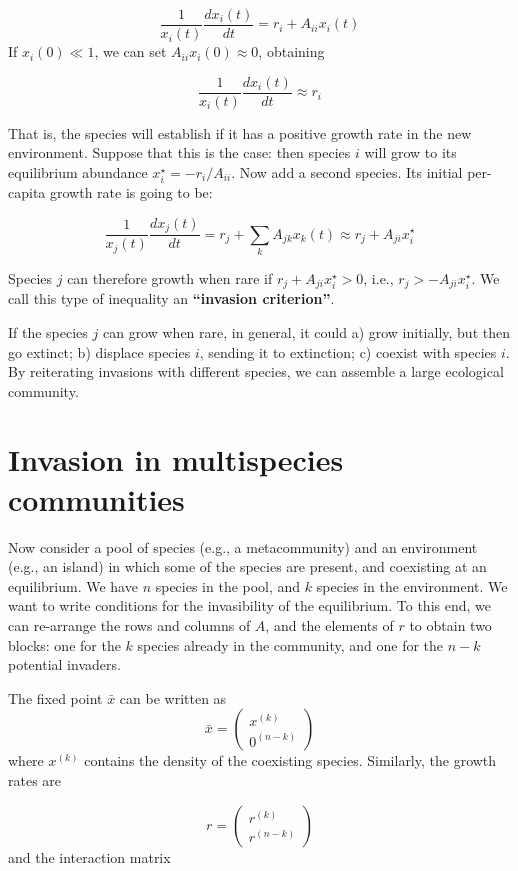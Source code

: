 \documentclass[]{book}
\begin{document}
\[
\dfrac{1}{x_i(t)}\dfrac{dx_i(t)}{dt} = r_i + A_{ii} x_i(t)
\]
If \(x_i(0) \ll 1\), we can set \(A_{ii} x_i(0) \approx 0\), obtaining

\[
\dfrac{1}{x_i(t)}\dfrac{dx_i(t)}{dt} \approx r_i
\]

That is, the species will establish if it has a positive growth rate in the new environment. Suppose that this is the case: then species \(i\) will grow to its equilibrium abundance \(x_i^\star = -r_i / A_{ii}\). Now add a second species. Its initial per-capita growth rate is going to be:

\[
\dfrac{1}{x_j(t)}\dfrac{dx_j(t)}{dt} = r_j + \sum_k A_{jk} x_k(t) \approx r_j + A_{ji}x_i^\star
\]

Species \(j\) can therefore growth when rare if \(r_j + A_{ji}x_i^\star > 0\), i.e., \(r_j > -A_{ji}x_i^\star\). We call this type of inequality an \textbf{``invasion criterion''}.

If the species \(j\) can grow when rare, in general, it could a) grow initially, but then go extinct; b) displace species \(i\), sending it to extinction; c) coexist with species \(i\). By reiterating invasions with different species, we can assemble a large ecological community.

\hypertarget{invasion-in-multispecies-communities}{%
\section{Invasion in multispecies communities}\label{invasion-in-multispecies-communities}}

Now consider a pool of species (e.g., a metacommunity) and an environment (e.g., an island) in which some of the species are present, and coexisting at an equilibrium. We have \(n\) species in the pool, and \(k\) species in the environment. We want to write conditions for the invasibility of the equilibrium. To this end, we can re-arrange the rows and columns of \(A\), and the elements of \(r\) to obtain two blocks: one for the \(k\) species already in the community, and one for the \(n-k\) potential invaders.

The fixed point \(\bar{x}\) can be written as
\[
\bar{x} = \left(\begin{array}{l}
x^{(k)} \\
0^{(n-k)} 
\end{array} \right)
\]
where \(x^{(k)}\) contains the density of the coexisting species. Similarly, the growth rates are

\[
r = \left(\begin{array}{l}
r^{(k)} \\
r^{(n-k)} 
\end{array} \right)
\]
and the interaction matrix
\end{document}
